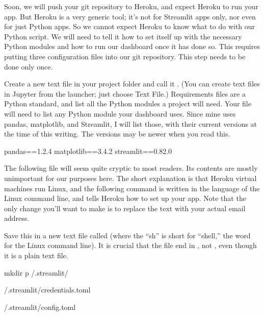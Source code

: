 \documentclass[letterpaper,10pt,english]{jupyterBook}
\begin{document}
\sphinxAtStartPar
Soon, we will push your git repository to Heroku, and expect Heroku to run your app.  But Heroku is a very generic tool; it’s not for Streamlit apps only, nor even for just Python apps.  So we cannot expect Heroku to know what to do with our Python script.  We will need to tell it how to set itself up with the necessary Python modules and how to run our dashboard once it has done so.  This requires putting three configuration files into our git repository.  This step needs to be done only once.

\sphinxAtStartPar
{} Create a new text file in your project folder and call it .  (You can create text files in Jupyter from the launcher; just choose Text File.)  Requirements files are a Python standard, and list all the Python modules a project will need.  Your  file will need to list any Python module your dashboard uses.  Since mine uses pandas, matplotlib, and Streamlit, I will list those, with their current versions at the time of this writing.  The versions may be newer when you read this.

\begin{sphinxVerbatim}[commandchars=\\\{\}]
pandas==1.2.4
matplotlib==3.4.2
streamlit==0.82.0
\end{sphinxVerbatim}

\sphinxAtStartPar
{} The following file will seem quite cryptic to most readers.  Its contents are mostly unimportant for our purposes here.  The short explanation is that Heroku virtual machines run Linux, and the following command is written in the language of the Linux command line, and tells Heroku how to set up your app.  Note that the only change you’ll want to make is to replace the text  with your actual email address.

\sphinxAtStartPar
Save this in a new text file called  (where the “sh” is short for “shell,” the word for the Linux command line).  It is crucial that the file end in , not , even though it is a plain text file.

\begin{sphinxVerbatim}[commandchars=\\\{\}]
mkdir \PYGZhy{}p \PYGZti{}/.streamlit/

 
 \PYGZgt{} \PYGZti{}/.streamlit/credentials.toml

 
 \PYGZgt{} \PYGZti{}/.streamlit/config.toml
\end{sphinxVerbatim}
\end{document}
